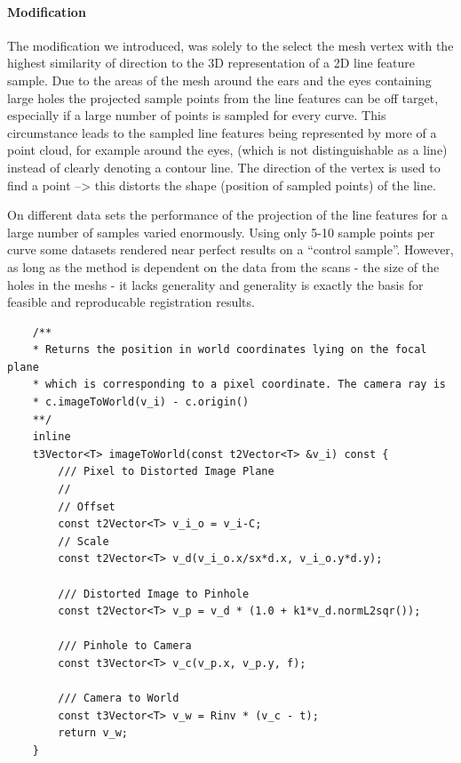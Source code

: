 \paragraph{Modification}
The modification we introduced, was solely to the select the mesh vertex with the highest similarity of direction to the 3D representation of a 2D line feature sample. Due to the areas of the mesh around the ears and the eyes containing large holes the projected sample points from the line features can be off target, especially if a large number of points is sampled for every curve. This circumstance leads to the sampled line features being represented by more of a point cloud, for
example around the eyes, (which is not distinguishable as a line) instead of clearly denoting a contour line.
The direction of the vertex is used to find a point --> this distorts the shape (position of sampled points) of the line.

On different data sets the performance of the projection of the line features for a large number of samples varied enormously.
Using only 5-10 sample points per curve some datasets rendered near perfect results on a ``control sample''.  
However, as long as the method is dependent on the data from the scans - the size of the holes in the meshs - it lacks generality and generality is exactly the basis for feasible and reproducable registration results.

\begin{lstlisting}
    /**
    * Returns the position in world coordinates lying on the focal plane
    * which is corresponding to a pixel coordinate. The camera ray is
    * c.imageToWorld(v_i) - c.origin()
    **/
    inline
    t3Vector<T> imageToWorld(const t2Vector<T> &v_i) const {
        /// Pixel to Distorted Image Plane
        //
        // Offset 
        const t2Vector<T> v_i_o = v_i-C;
        // Scale
        const t2Vector<T> v_d(v_i_o.x/sx*d.x, v_i_o.y*d.y);

        /// Distorted Image to Pinhole
        const t2Vector<T> v_p = v_d * (1.0 + k1*v_d.normL2sqr());

        /// Pinhole to Camera
        const t3Vector<T> v_c(v_p.x, v_p.y, f);

        /// Camera to World
        const t3Vector<T> v_w = Rinv * (v_c - t);
        return v_w;
    }
\end{lstlisting}

